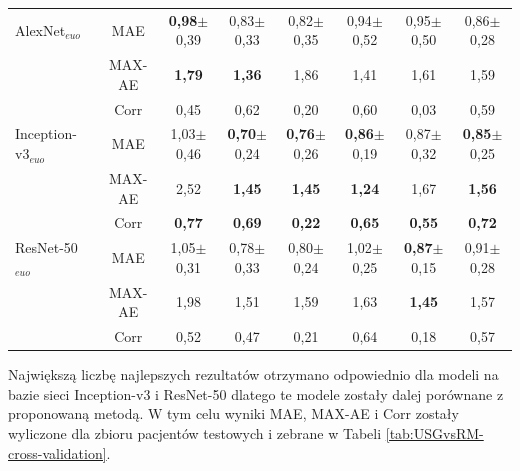 \begin{table}[h]
\begin{tabular}{lc||c|c|c|c|c|c}
		AlexNet$_{euo}$ & MAE & \textbf{0,98}$\pm$0,39 & 0,83$\pm$0,33 & 0,82$\pm$0,35 & 0,94$\pm$0,52 & 0,95$\pm$0,50 & 0,86$\pm$0,28  \\
		& MAX-AE & \textbf{1,79} & \textbf{1,36} & 1,86 & 1,41 & 1,61 & 1,59 \\ 
		& Corr & 0,45 & 0,62 & 0,20 & 0,60 & 0,03 & 0,59 \\ \hline
		Inception-v3$_{euo}$ & MAE & 1,03$\pm$0,46 & \textbf{0,70}$\pm$0,24 & \textbf{0,76}$\pm$0,26 & \textbf{0,86}$\pm$0,19 & 0,87$\pm$0,32 & \textbf{0,85}$\pm$0,25  \\
		& MAX-AE & 2,52 & \textbf{1,45} & \textbf{1,45} & \textbf{1,24} & 1,67 & \textbf{1,56} \\ 
		& Corr & \textbf{0,77} & \textbf{0,69} & \textbf{0,22} & \textbf{0,65} & \textbf{0,55} & \textbf{0,72} \\ \hline
		ResNet-50$_{euo}$ & MAE & 1,05$\pm$0,31 & 0,78$\pm$0,33 & 0,80$\pm$0,24 & 1,02$\pm$0,25 & \textbf{0,87}$\pm$0,15 & 0,91$\pm$0,28 \\
		& MAX-AE & 1,98 & 1,51 & 1,59 & 1,63 & \textbf{1,45} & 1,57 \\
		& Corr & 0,52 & 0,47 & 0,21 & 0,64 & 0,18 & 0,57 \\ 
	\end{tabular}
\end{table}
\renewcommand{\arraystretch}{1}

Największą liczbę najlepszych rezultatów otrzymano odpowiednio dla modeli na bazie sieci Inception-v3 i ResNet-50 dlatego te modele zostały dalej porównane z proponowaną metodą. W tym celu wyniki MAE, MAX-AE i Corr zostały wyliczone dla zbioru pacjentów testowych i zebrane w Tabeli \ref{tab:USGvsRM-cross-validation}.

